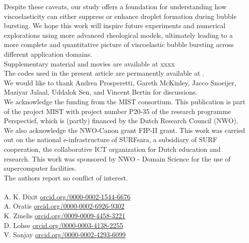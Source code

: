 \documentclass{jfm}
\newcommand{\bb}{\color{black} \normalfont}
\begin{document}
Despite these caveats, our study offers a foundation for understanding how viscoelasticity can either suppress or enhance droplet formation during bubble bursting. We hope this work will inspire future experiments and numerical explorations using more advanced rheological models, ultimately leading to a more complete and quantitative picture of viscoelastic bubble bursting across different application domains.
\bb\\


 \label{SM} Supplementary material and movies are available at xxxx \\

 The codes used in the present article are permanently available at \citet{Sanjay2024code}.\\

 We would like to thank Andrea Prosperetti, Gareth McKinley, Jacco Snoeijer, Maziyar Jalaal, Uddalok Sen, and Vincent Bertin for discussions.\\

 We acknowledge the funding from the MIST consortium. This publication is part of the project MIST with project number P20-35 of the research programme Perspectief, which is (partly) financed by the Dutch Research Council (NWO). We also acknowledge the NWO-Canon grant FIP-II grant. This work was carried out on the national e-infrastructure of SURFsara, a subsidiary of SURF cooperation, the collaborative ICT organization for Dutch education and research. This work was sponsored by NWO - Domain Science for the use of supercomputer facilities.\\

 The  authors report no conflict of interest. \\

 \\
A. K. Dixit \href{https://orcid.org/0000-0002-1544-6676}{orcid.org/0000-0002-1544-6676}\\
A. Oratis \href{https://orcid.org/0000-0002-6926-9302}{orcid.org/0000-0002-6926-9302} \\
K. Zinelis \href{https://orcid.org/0009-0009-4458-3221}{orcid.org/0009-0009-4458-3221} \\
D. Lohse \href{https://orcid.org/0000-0003-4138-2255}{orcid.org/0000-0003-4138-2255}\\
V. Sanjay \href{https://orcid.org/0000-0002-4293-6099}{orcid.org/0000-0002-4293-6099}\\
\end{document}
